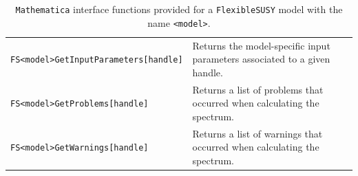 \documentclass[final,3p,11pt,pdflatex]{elsarticle}
\makeatletter
\newcommand{\fs}{\texttt{FlexibleSUSY}\@\xspace}
\newcommand{\mathematica}{\texttt{Ma\-the\-ma\-ti\-ca}\xspace}
\newcommand{\code}[1]{\lstinline|#1|}  %
\makeatother
\begin{document}
\begin{table}[tbh]
\begin{tabularx}{\textwidth}{lX}
    \code{FS<model>GetInputParameters[handle]} & Returns the
    model-specific input parameters associated to a given handle.\\

    \code{FS<model>GetProblems[handle]} & Returns a list of problems
    that occurred when calculating the spectrum.\\

    \code{FS<model>GetWarnings[handle]} & Returns a list of warnings
    that occurred when calculating the spectrum.\\
    \bottomrule
  \end{tabularx}
  \caption{\mathematica interface functions provided for a \fs model with the name \code{<model>}.}
  \label{tab:mma_ifce_functions}
\end{table}
%
\end{document}
